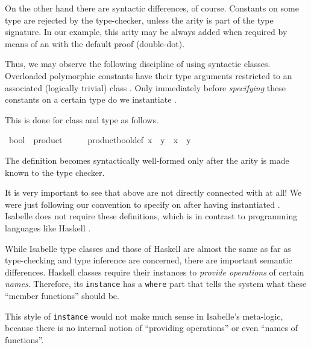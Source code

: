 \begin{isabellebody}
\begin{isamarkuptext}
  On the other hand there are syntactic differences, of course.
 Constants \isa{{\isasymodot}} on some type \isa{{\isasymtau}} are rejected by the
 type-checker, unless the arity  is part of the
 type signature.  In our example, this arity may be always added when
 required by means of an  with the default proof
 (double-dot).

  \medskip Thus, we may observe the following discipline of using
  syntactic classes.  Overloaded polymorphic constants have their type
  arguments restricted to an associated (logically trivial) class
  .  Only immediately before \emph{specifying} these
  constants on a certain type \isa{{\isasymtau}} do we instantiate .

  This is done for class  and type  as
  follows.%
\end{isamarkuptext}%
\isamarkuptrue%
\isamarkupfalse%
\ bool\ {\isacharcolon}{\isacharcolon}\ product%
\isadelimproof
\ %
\endisadelimproof
%
\isatagproof
\isacommand{{\isachardot}{\isachardot}}\isamarkupfalse%
%
\endisatagproof
{\isafoldproof}%
%
\isadelimproof
%
\endisadelimproof
\isanewline
{}\isamarkupfalse%
\ {\isacharparenleft}\isanewline
\ \ product{\isacharunderscore}bool{\isacharunderscore}def{\isacharcolon}\ {\isachardoublequoteopen}x\ {\isasymodot}\ y\ {\isasymequiv}\ x\ {\isasymand}\ y{\isachardoublequoteclose}%
\begin{isamarkuptext}%
The definition  becomes syntactically
 well-formed only after the arity  is made
 known to the type checker.

 \medskip It is very important to see that above  are
 not directly connected with  at all!  We were
 just following our convention to specify \isa{{\isasymodot}} on 
 after having instantiated .  Isabelle does
 not require these definitions, which is in contrast to programming
 languages like Haskell \cite{haskell-report}.

 \medskip While Isabelle type classes and those of Haskell are almost
 the same as far as type-checking and type inference are concerned,
 there are important semantic differences.  Haskell classes require
 their instances to \emph{provide operations} of certain \emph{names}.
 Therefore, its \texttt{instance} has a \texttt{where} part that tells
 the system what these ``member functions'' should be.

 This style of \texttt{instance} would not make much sense in
 Isabelle's meta-logic, because there is no internal notion of
 ``providing operations'' or even ``names of functions''.%
\end{isamarkuptext}%
\isamarkuptrue%
%
\isadelimtheory
%
\endisadelimtheory
%
\isatagtheory
{}\isamarkupfalse%
%
\endisatagtheory
{\isafoldtheory}%
%
\isadelimtheory
%
\endisadelimtheory
\isanewline
\end{isabellebody}%
